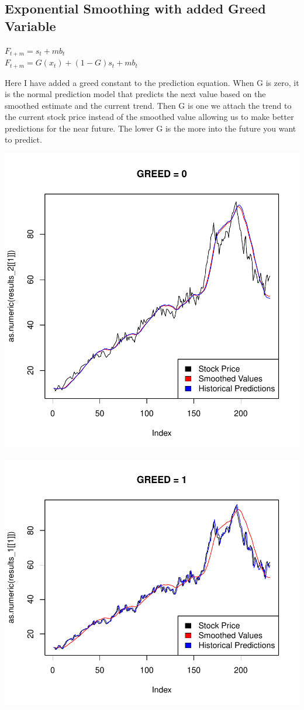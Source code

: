 \documentclass[english]{report}
\begin{document}
\newpage
\subsection{Exponential Smoothing with added Greed Variable}

\Large{
\( F_{t+m} = s_t + mb_t \)\\
\( F_{t+m} = G(x_t) + (1-G)s_t + mb_t \)}

\Large{Here I have added a greed constant to the prediction equation. When G is zero, it is the normal prediction model that predicts the next value based on the smoothed estimate and the current trend. Then G is one we attach the trend to the current stock price instead of the smoothed value allowing us to make better predictions for the near future. The lower G is the more into the future you want to predict.}

\includegraphics{MV_report-003}

\includegraphics{MV_report-004}
\end{document}
